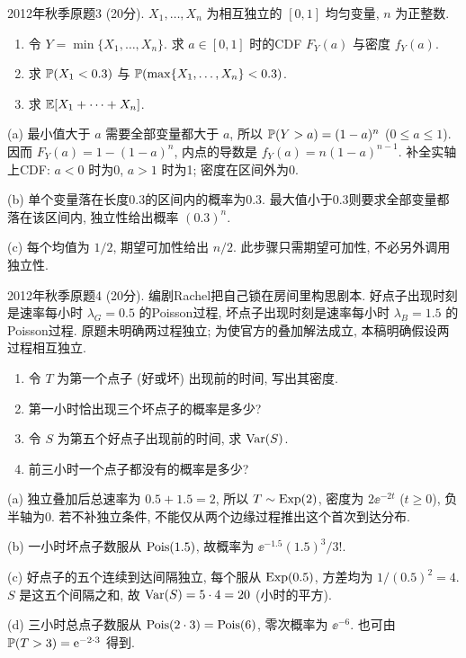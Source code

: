 \begin{exercise}\label{m2:2012f:q3}
2012年秋季原题3 (20分). $X_1,\ldots,X_n$ 为相互独立的 $[0,1]$ 均匀变量, $n$ 为正整数.
\begin{enumerate}
\item[(a)]\label{m2:2012f:q3:a} 令 $Y=\min\{X_1,\ldots,X_n\}$. 求 $a\in[0,1]$ 时的CDF $F_Y(a)$ 与密度 $f_Y(a)$.
\item[(b)]\label{m2:2012f:q3:b} 求 $\mathbb P(X_1<0.3)$ 与 $\mathbb P(\max\{X_1,\ldots,X_n\}<0.3)$.
\item[(c)]\label{m2:2012f:q3:c} 求 $\mathbb E[X_1+\cdots+X_n]$.
\end{enumerate}
\end{exercise}
\begin{solution}
(a) 最小值大于 $a$ 需要全部变量都大于 $a$, 所以 $\mathbb P(Y>a)=(1-a)^n$ ($0\le a\le1$). 因而 $F_Y(a)=1-(1-a)^n$, 内点的导数是 $f_Y(a)=n(1-a)^{n-1}$. 补全实轴上CDF: $a<0$ 时为0, $a>1$ 时为1; 密度在区间外为0.

(b) 单个变量落在长度0.3的区间内的概率为0.3. 最大值小于0.3则要求全部变量都落在该区间内, 独立性给出概率 $(0.3)^n$.

(c) 每个均值为 $1/2$, 期望可加性给出 $n/2$. 此步骤只需期望可加性, 不必另外调用独立性.
\end{solution}

\begin{exercise}\label{m2:2012f:q4}
2012年秋季原题4 (20分). 编剧Rachel把自己锁在房间里构思剧本. 好点子出现时刻是速率每小时 $\lambda_G=0.5$ 的Poisson过程, 坏点子出现时刻是速率每小时 $\lambda_B=1.5$ 的Poisson过程. 原题未明确两过程独立; 为使官方的叠加解法成立, 本稿明确假设两过程相互独立.
\begin{enumerate}
\item[(a)]\label{m2:2012f:q4:a} 令 $T$ 为第一个点子 (好或坏) 出现前的时间, 写出其密度.
\item[(b)]\label{m2:2012f:q4:b} 第一小时恰出现三个坏点子的概率是多少?
\item[(c)]\label{m2:2012f:q4:c} 令 $S$ 为第五个好点子出现前的时间, 求 $\operatorname{Var}(S)$.
\item[(d)]\label{m2:2012f:q4:d} 前三小时一个点子都没有的概率是多少?
\end{enumerate}
\end{exercise}
\begin{solution}
(a) 独立叠加后总速率为 $0.5+1.5=2$, 所以 $T\sim\operatorname{Exp}(2)$, 密度为 $2\ee^{-2t}$ ($t\ge0$), 负半轴为0. 若不补独立条件, 不能仅从两个边缘过程推出这个首次到达分布.

(b) 一小时坏点子数服从 $\operatorname{Pois}(1.5)$, 故概率为 $\ee^{-1.5}(1.5)^3/3!$.

(c) 好点子的五个连续到达间隔独立, 每个服从 $\operatorname{Exp}(0.5)$, 方差均为 $1/(0.5)^2=4$. $S$ 是这五个间隔之和, 故 $\operatorname{Var}(S)=5\cdot4=20$ (小时的平方).

(d) 三小时总点子数服从 $\operatorname{Pois}(2\cdot3)=\operatorname{Pois}(6)$, 零次概率为 $\ee^{-6}$. 也可由 $\mathbb P(T>3)=\mathrm e^{-2\cdot3}$ 得到.
\end{solution}

